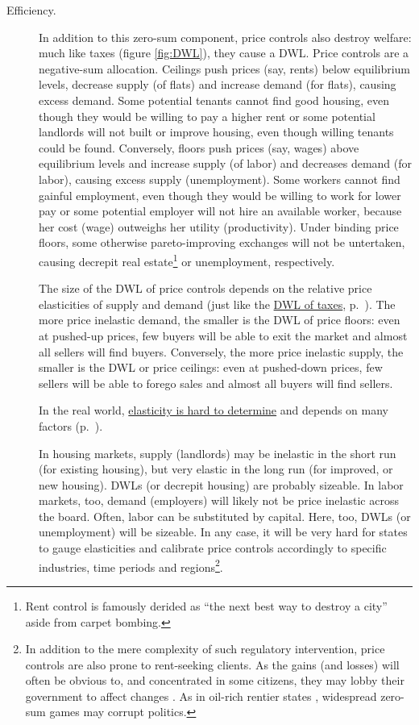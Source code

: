 \begin{description}
	\item[Efficiency.]
		In addition to this zero-sum component, price controls also destroy welfare: much like taxes (figure \ref{fig:DWL}), they cause a \gls{DWL}.  Price controls are a negative-sum allocation. Ceilings push prices (say, rents) below equilibrium levels, decrease supply (of flats) and increase demand (for flats), causing excess demand. Some potential tenants cannot find good housing, even though they would be willing to pay a higher rent or some potential landlords will not built or improve housing, even though willing tenants could be found. Conversely, floors push prices (say, wages) above equilibrium levels and increase supply (of labor) and decreases demand (for labor), causing excess supply (unemployment). Some workers cannot find gainful employment, even though they would be willing to work for lower pay or some potential employer will not hire an available worker, because her cost (wage) outweighs her utility (productivity). Under binding price floors, some otherwise pareto-improving exchanges will not be untertaken, causing decrepit real estate\footnote{
			Rent control is famously derided as ``the next best way to destroy a city'' aside from carpet bombing.}
		or unemployment, respectively.

		The size of the \gls{DWL} of price controls depends on the relative price elasticities of supply and demand (just like the \hyperref[sec:minimalDWL]{\gls{DWL} of taxes}, p.~\pageref{sec:minimalDWL}).
		The more price inelastic demand, the smaller is the \gls{DWL} of price floors: even at pushed-up prices, few buyers will be able to exit the market and almost all sellers will find buyers. Conversely, the more price inelastic supply, the smaller is the \gls{DWL} or price ceilings: even at pushed-down prices, few sellers will be able to forego sales and almost all buyers will find sellers.

		In the real world, \hyperref[sec:well-determinedincidence]{elasticity is hard to determine} and depends on many factors (p.~\pageref{sec:well-determinedincidence}).

		In housing markets, supply (landlords) may be inelastic in the short run (for existing housing), but very elastic in the long run (for improved, or new housing). \glspl{DWL} (or decrepit housing) are probably sizeable. In labor markets, too, demand (employers) will likely not be price inelastic across the board. Often, labor can be substituted by capital. Here, too, \glspl{DWL} (or unemployment) will be sizeable. In any case, it will be very hard for states to gauge elasticities and calibrate price controls accordingly to specific industries, time periods and regions\footnote{
			In addition to the mere complexity of such regulatory intervention, price controls are also prone to rent-seeking clients. As the gains (and losses) will often be obvious to, and concentrated in some citizens, they may lobby their government to affect changes \citep{Peltzman1976,Posner1975,Krueger1974}. As in oil-rich rentier states \citep{Beblawi1990}, widespread zero-sum games may corrupt politics.}.


\end{description}
